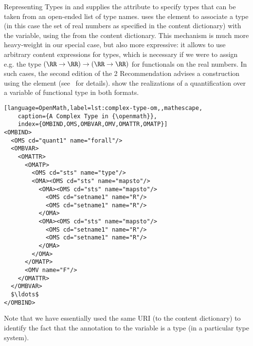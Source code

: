 \begin{omgroup}[id=mobj,short=Mathematical Objects]
\begin{module}[id=omml-types]
\begin{omgroup}[id=mobj.types]{Representing Types in {\cmathml} and {\openmath}}
{\mathml} supplies the {} attribute
to specify types that can be taken from an open-ended list of type names.  {\openmath}
uses the {} element to associate a type (in this case the set
of real numbers as specified in the {} content dictionary) with the
variable, using the {} {} from the
{} content dictionary. This mechanism is much more heavy-weight in our
special case, but also more expressive: it allows to use arbitrary content expressions for
types, which is necessary if we were to assign e.g. the type $(\RR\to\RR)\to(\RR\to\RR)$
for functionals on the real numbers. In such cases, the second edition of the {\mathml}2
Recommendation advises a construction using the {} element
(see~\cite{DevKoh:stm03} for details).  {}
show the realizations of a quantification over a variable of functional type in both
formats.

\begin{lstlisting}[language=OpenMath,label=lst:complex-type-om,,mathescape,
    caption={A Complex Type in {\openmath}},
    index={OMBIND,OMS,OMBVAR,OMV,OMATTR,OMATP}]
<OMBIND>                          
  <OMS cd="quant1" name="forall"/> 
  <OMBVAR>                         
    <OMATTR>                        
      <OMATP>                        
        <OMS cd="sts" name="type"/>
        <OMA><OMS cd="sts" name="mapsto"/>   
          <OMA><OMS cd="sts" name="mapsto"/>   
            <OMS cd="setname1" name="R"/>  
            <OMS cd="setname1" name="R"/>
          </OMA>
          <OMA><OMS cd="sts" name="mapsto"/>   
            <OMS cd="setname1" name="R"/>  
            <OMS cd="setname1" name="R"/>
          </OMA>
        </OMA>  
      </OMATP>                       
      <OMV name="F"/>                
    </OMATTR>                        
  </OMBVAR>                        
  $\ldots$
</OMBIND>                         
\end{lstlisting}

Note that we have essentially used the same URI (to the {} content
dictionary) to identify the fact that the annotation to the variable is a type (in
a particular type system).


\end{omgroup}
\end{module}
\end{omgroup}
